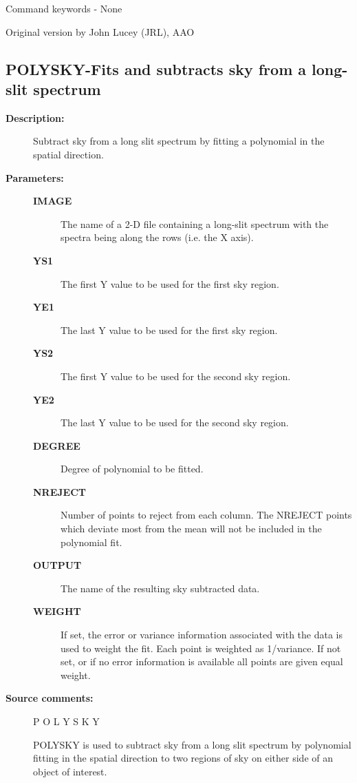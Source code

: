 \begin{description}
\begin{description}
\begin{terminalv}
 Command keywords - None

 Original version by John Lucey (JRL), AAO
\end{terminalv}
\end{description}
\subsection{POLYSKY-\label{POLYSKY}Fits and subtracts sky from a long-slit spectrum}
\begin{description}

\item [\textbf{Description:}]
 Subtract sky from a long slit spectrum by fitting a polynomial
 in the spatial direction.

\item [\textbf{Parameters:}]
\begin{description}
\item [\textbf{IMAGE}]
 The name of a 2-D file containing a long-slit
 spectrum with the spectra being along the rows
 (i.e. the X axis).
\item [\textbf{YS1}]
 The first Y value to be used for the first sky region.
\item [\textbf{YE1}]
 The last Y value to be used for the first sky region.
\item [\textbf{YS2}]
 The first Y value to be used for the second sky region.
\item [\textbf{YE2}]
 The last Y value to be used for the second sky region.
\item [\textbf{DEGREE}]
 Degree of polynomial to be fitted.
\item [\textbf{NREJECT}]
 Number of points to reject from each column. The NREJECT
 points which deviate most from the mean will not be
 included in the polynomial fit.
\item [\textbf{OUTPUT}]
 The name of the resulting sky subtracted data.
\item [\textbf{WEIGHT}]
 If set, the error or variance information associated
 with the data is used to weight the fit.  Each point
 is weighted as 1/variance. If not set, or if no
 error information is available all points are given
 equal weight.
\end{description}

\item [\textbf{Source comments:}]
\begin{terminalv}
 P O L Y S K Y

 POLYSKY is used to subtract sky from a long slit spectrum by
 polynomial fitting in the spatial direction to two regions of
 sky on either side of an object of interest.


\end{terminalv}
\end{description}
\end{description}
